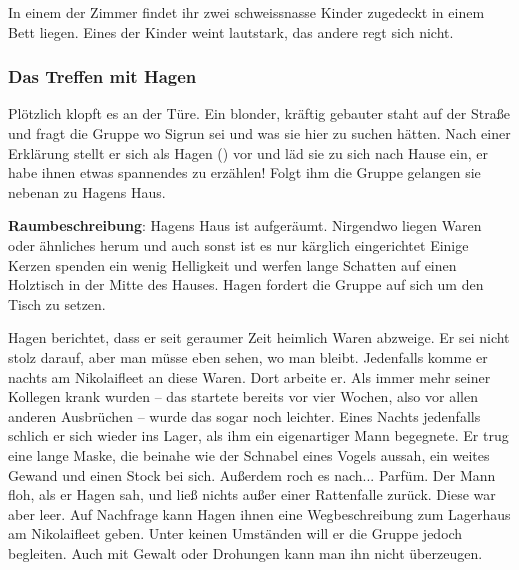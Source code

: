 
In einem der Zimmer findet ihr zwei schweissnasse Kinder zugedeckt in einem Bett liegen. Eines der Kinder weint lautstark, das andere regt sich nicht.



\subsubsection{Das Treffen mit Hagen}
\label{klopf}


Plötzlich klopft es an der Türe. Ein blonder, kräftig gebauter staht auf der Straße und fragt die Gruppe wo Sigrun sei und was sie hier zu suchen hätten. Nach einer Erklärung stellt er sich als Hagen (\blue{\ref{Hagen}}) vor und läd sie zu sich nach Hause ein, er habe ihnen etwas spannendes zu erzählen! Folgt ihm die Gruppe gelangen sie nebenan zu Hagens Haus.

\textbf{Raumbeschreibung}: Hagens Haus ist aufgeräumt. Nirgendwo liegen Waren oder ähnliches herum und auch sonst ist es nur kärglich eingerichtet Einige Kerzen spenden ein wenig Helligkeit und werfen lange Schatten auf einen Holztisch in der Mitte des Hauses. Hagen fordert die Gruppe auf sich um den Tisch zu setzen.


Hagen berichtet, dass er seit geraumer Zeit heimlich Waren abzweige. Er sei nicht stolz darauf, aber man müsse eben sehen, wo man bleibt. Jedenfalls komme er nachts am Nikolaifleet an diese Waren. Dort arbeite er. Als immer mehr seiner Kollegen krank wurden – das startete bereits vor vier Wochen, also vor allen anderen Ausbrüchen – wurde das sogar noch leichter. Eines Nachts jedenfalls schlich er sich wieder ins Lager, als ihm ein eigenartiger Mann begegnete. Er trug eine lange Maske, die beinahe wie der Schnabel eines Vogels aussah, ein weites Gewand und einen Stock bei sich. Außerdem roch es nach... Parfüm. Der Mann floh, als er Hagen sah, und ließ nichts außer einer Rattenfalle zurück. Diese war aber leer. Auf Nachfrage kann Hagen ihnen eine Wegbeschreibung zum Lagerhaus am Nikolaifleet geben. Unter keinen Umständen will er die Gruppe jedoch begleiten. Auch mit Gewalt oder Drohungen kann man ihn nicht überzeugen.

